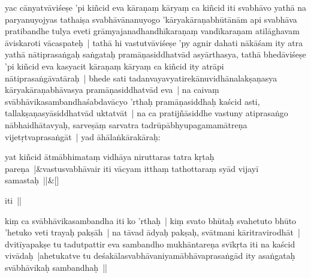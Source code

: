 \documentclass[article,12pt,a4paper]{memoir}%
\newcounter{parCount}
\begin{document}
	  
	  \pstart \leavevmode%
	\label{thakur75-47.22}yac cānyatvāviśeṣe 'pi kiñcid eva kāraṇaṃ kāryaṃ ca kiñcid iti svabhāvo yathā na paryanuyojyas tathaiṣa svabhāvānanuyogo 'kāryakāraṇabhūtā\leavevmode{}nām api svabhāva pratibandhe tulya eveti grāmyajanadhandhīkaraṇaṃ \label{ratnakīrtinibandhāvali__36r1PF7IMVIAT61KSGR7T0A55I7}vandī\label{ratnakīrtinibandhāvali__36r1PF7IMVHGMKIKSCKKF1EMQRT}karaṇam atilāghavam āviskaroti vācaspateḥ | tathā hi vastutvāviśeṣe 'py agnir dahati nākāśam ity atra yathā nātiprasaṅgaḥ saṅgataḥ pramāṇasiddhatvād asyārthasya, tathā bhedāviśeṣe 'pi kiñcid eva kasyacit kāraṇaṃ kāryaṃ ca kiñcid ity atrāpi nātiprasaṅgāvatāraḥ | bhede sati tadanvayavyatirekānuvidhānalakṣaṇasya kāryakāraṇabhāvasya pramāṇasiddhatvād eva | na caivaṃ svābhāvikasambandhaśabdavācyo 'rthaḥ pramāṇasiddhaḥ kaścid asti, tallakṣaṇasyāsiddhatvād uktatvāt | na ca pratijñāsiddhe vastuny atiprasaṅgo nābhaidhātavyaḥ, sarveṣāṃ sarvatra tadrūpābhyupagamamātreṇa vijetṛtvaprasaṅgāt | yad āhālaṅkārakāraḥ:
	{}
	\pend%
      
	    
	    \stanza[\smallbreak]
	  yat kiñcid ātmābhimataṃ vidhāya niruttaras tatra kṛtaḥ pareṇa |&vastusvabhāvair iti vācyam itthaṃ tathottaraṃ syād vijayī samastaḥ ||\&[\smallbreak]
	  
	  
	  

	  
	  \pstart \leavevmode%
	iti ||
	{}
	\pend%
      

	  
	  \pstart \leavevmode%
	\label{thakur75-48.4}kiṃ ca svābhāvikasambandha iti ko 'rthaḥ | kiṃ svato bhūtaḥ svahetuto bhūto 'hetuko veti trayaḥ pakṣāh | na tāvad ādyaḥ pakṣaḥ, svātmani kāritravirodhāt | dvitīyapakṣe tu tadutpattir eva sambandho mukhāntareṇa svīkṛta iti na kaścid vivādaḥ |ahetukatve tu deśakālasvabhāvaniyamābhāvaprasaṅgād ity asaṅgataḥ svābhāvikaḥ sambandhaḥ ||
	{}
	\pend%
      
\end{document}
